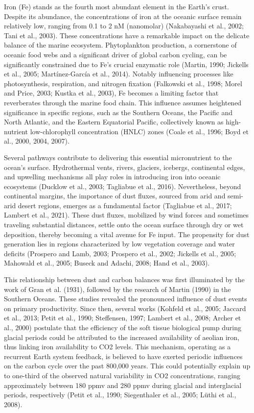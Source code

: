 
Iron (Fe) stands as the fourth most abundant element in the Earth’s crust. Despite its abundance, the concentrations of iron at the oceanic surface remain relatively low, ranging from 0.1 to 2 nM (nanomolar) (Nakabayashi et al., 2002; Tani et al., 2003). These concentrations have a remarkable impact on the delicate balance of the marine ecosystem. Phytoplankton production, a cornerstone of oceanic food webs and a significant driver of global carbon cycling, can be significantly constrained due to Fe’s crucial enzymatic role (Martin, 1990; Jickells et al., 2005; Martínez-García et al., 2014). Notably influencing processes like photosynthesis, respiration, and nitrogen fixation (Falkowski et al., 1998; Morel and Price, 2003; Kustka et al., 2003), Fe becomes a limiting factor that reverberates through the marine food chain. This influence assumes heightened significance in specific regions, such as the Southern Oceans, the Pacific and North Atlantic, and the Eastern Equatorial Pacific, collectively known as high-nutrient low-chlorophyll concentration (HNLC) zones (Coale et al., 1996; Boyd et al., 2000, 2004, 2007). 

Several pathways contribute to delivering this essential micronutrient to the ocean’s surface. Hydrothermal vents, rivers, glaciers, icebergs, continental edges, and upwelling mechanisms all play roles in introducing iron into oceanic ecosystems (Ducklow et al., 2003; Tagliabue et al., 2016). Nevertheless, beyond continental margins, the importance of dust fluxes, sourced from arid and semi-arid desert regions, emerges as a fundamental factor (Tagliabue et al., 2017; Lambert et al., 2021). These dust fluxes, mobilized by wind forces and sometimes traveling substantial distances, settle onto the ocean surface through dry or wet deposition, thereby becoming a vital avenue for Fe input. The propensity for dust generation lies in regions characterized by low vegetation coverage and water deficits (Prospero and Lamb, 2003; Prospero et al., 2002; Jickells et al., 2005; Mahowald et al., 2005; Buseck and Adachi, 2008; Hand et al., 2003).

This relationship between dust and carbon balances was first illuminated by the work of Gran et al. (1931), followed by the research of Martin (1990) in the Southern Oceans. These studies revealed the pronounced influence of dust events on primary productivity. Since then, several works (Kohfeld et al., 2005; Jaccard et al., 2013; Petit et al., 1990; Steffensen, 1997; Lambert et al., 2008; Archer et al., 2000) postulate that the efficiency of the soft tissue biological pump during glacial periods could be attributed to the increased availability of aeolian iron, thus linking iron availability to CO2 levels. This mechanism, operating as a recurrent Earth system feedback, is believed to have exerted periodic influences on the carbon cycle over the past 800,000 years. This could potentially explain up to one-third of the observed natural variability in CO2 concentrations, ranging approximately between 180 ppmv and 280 ppmv during glacial and interglacial periods, respectively (Petit et al., 1990; Siegenthaler et al., 2005; Lüthi et al., 2008).

